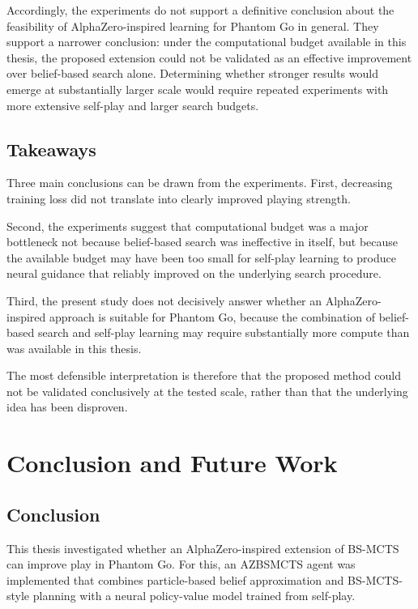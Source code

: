\documentclass[12pt,oneside,openright]{article}
\begin{document}
Accordingly, the experiments do not support a definitive conclusion about the feasibility of AlphaZero-inspired learning for Phantom Go in general. They support a narrower conclusion: under the computational budget available in this thesis, the proposed extension could not be validated as an effective improvement over belief-based search alone. Determining whether stronger results would emerge at substantially larger scale would require repeated experiments with more extensive self-play and larger search budgets.

\subsection{Takeaways}


Three main conclusions can be drawn from the experiments. First, decreasing training loss did not translate into clearly improved playing strength.


Second, the experiments suggest that computational budget was a major bottleneck not because belief-based search was ineffective in itself, but because the available budget may have been too small for self-play learning to produce neural guidance that reliably improved on the underlying search procedure.


Third, the present study does not decisively answer whether an AlphaZero-inspired approach is suitable for Phantom Go, because the combination of belief-based search and self-play learning may require substantially more compute than was available in this thesis.

The most defensible interpretation is therefore that the proposed method could not be validated conclusively at the tested scale, rather than that the underlying idea has been disproven.


\section{Conclusion and Future Work}

\subsection{Conclusion}

This thesis investigated whether an AlphaZero-inspired extension of BS-MCTS can improve play in Phantom Go. For this, an AZBSMCTS agent was implemented that combines particle-based belief approximation and BS-MCTS-style planning with a neural policy-value model trained from self-play.
\end{document}
